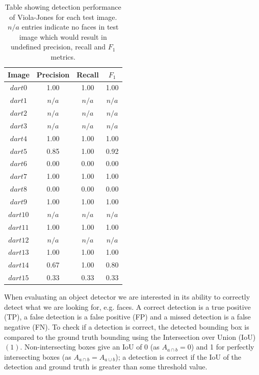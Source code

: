 \documentclass[11pt]{article}
\begin{document}
\begin{table}
\begin{tabular}{|c||c|c|c|} 
     \hline
     Image & Precision & Recall & $F_1$ \\ [0.5ex] 
     \hline
     $dart0$  & 1.00  & 1.00  & 1.00  \\ 
     $dart1$  & $n/a$ & $n/a$ & $n/a$ \\ 
     $dart2$  & $n/a$ & $n/a$ & $n/a$ \\ 
     $dart3$  & $n/a$ & $n/a$ & $n/a$ \\ 
     $dart4$  & 1.00  & 1.00  & 1.00  \\ 
     $dart5$  & 0.85  & 1.00  & 0.92  \\  
     $dart6$  & 0.00  & 0.00  & 0.00  \\  
     $dart7$  & 1.00  & 1.00  & 1.00  \\  
     $dart8$  & 0.00  & 0.00  & 0.00  \\ 
     $dart9$  & 1.00  & 1.00  & 1.00  \\ 
     $dart10$ & $n/a$ & $n/a$ & $n/a$ \\ 
     $dart11$ & 1.00  & 1.00  & 1.00  \\  
     $dart12$ & $n/a$ & $n/a$ & $n/a$ \\ 
     $dart13$ & 1.00  & 1.00  & 1.00  \\  
     $dart14$ & 0.67  & 1.00  & 0.80  \\  
     $dart15$ & 0.33  & 0.33  & 0.33  \\ [1ex] 
     \hline
\end{tabular}
\caption{Table showing detection performance of Viola-Jones for each test image. $n/a$ entries indicate no faces in test image which would result in undefined precision, recall and $F_1$ metrics.}
\label{vj_faces_results}
\end{table} 

When evaluating an object detector we are interested in its ability to correctly detect what we are looking for, e.g. faces. A correct detection is a true positive (TP), a false detection is a false positive (FP) and a missed detection is a false negative (FN). To check if a detection is correct, the detected bounding box is compared to the ground truth bounding using the Intersection over Union (IoU) $(1)$. Non-intersecting boxes give an IoU of 0 (as $A_{a \cap b}=0$) and 1 for perfectly intersecting boxes (as $A_{a \cap b}=A_{a \cup b}$); a detection is correct if the IoU of the detection and ground truth is greater than some threshold value.
\end{document}
